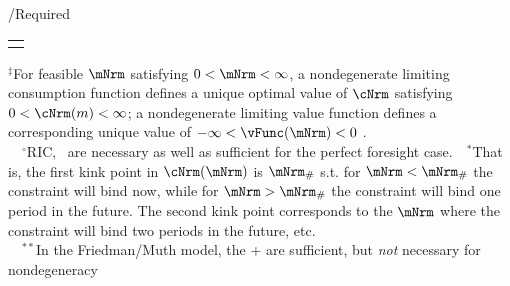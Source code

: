 \documentclass[\econtexRoot/BufferStockTheory]{subfiles}
\begin{document}
\begin{verbatimwrite}{\TableDir/Required}
\begin{table}
{\begin{tabular}{|l|l|l|}
\\ \hline \multicolumn{3}{c}{}
\end{tabular}
} %

\settowidth\TableWidth{\usebox{\Required}}
\newlength{\RequiredShrunk}
\newsavebox{\RequiredShrunkBox}

\savebox{\RequiredShrunkBox}{
  \settowidth{\RequiredShrunk}{\usebox{\Required}}
  \resizebox{\textwidth}{!}{\begin{minipage}{\RequiredShrunk}
      \usebox{\Required}
    \end{minipage}}
}

\usebox{\RequiredShrunkBox}


\parbox{\textwidth}{\footnotesize         $^{\ddagger}$For feasible $\mNrm$ satisfying $0 < \mNrm < \infty$, a nondegenerate limiting consumption function defines a unique optimal value of $\cNrm$ satisfying $0 < \cNrm(m) < \infty$; a nondegenerate limiting value function defines a corresponding unique value of $-\infty < \vFunc(\mNrm) < 0$ .\\
  ~~$^{\circ}$RIC, \FHWC~are necessary as well as sufficient for the perfect foresight case.~~$^{\ast}$That is, the first kink point in $\cNrm(\mNrm)$ is $\mNrm_{\#}$ s.t. for $\mNrm < \mNrm_{\#}$ the constraint will bind now, while for $\mNrm > \mNrm_{\#}$ the constraint will bind one period in the future.  The second kink point corresponds to the $\mNrm$ where the constraint will bind two periods in the future, etc.\\
  ~~$^{\ast\ast}$In the Friedman/Muth model, the {\RIC}+{\FHWC} are sufficient, but \textit{not} necessary for nondegeneracy} 
\end{table}
    
\end{verbatimwrite}
\clearpage

\end{document}
